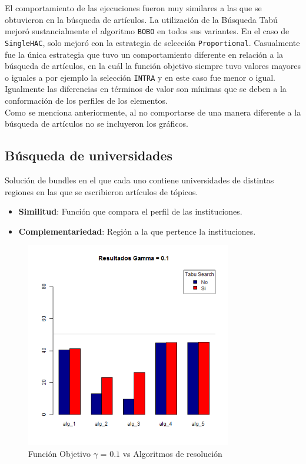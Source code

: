 El comportamiento de las ejecuciones fueron muy similares a las que se obtuvieron en la búsqueda de artículos. La utilización de la Búsqueda Tabú mejoró sustancialmente el algoritmo \texttt{BOBO} en todos sus variantes. En el caso de \texttt{SingleHAC}, solo mejoró con la estrategia de selección \texttt{Proportional}. Casualmente fue la única estrategia que tuvo un comportamiento diferente en relación a la búsqueda de artículos, en la cuál la función objetivo siempre tuvo valores mayores o iguales a por ejemplo la selección \texttt{INTRA} y en este caso fue menor o igual. Igualmente las diferencias en términos de valor son mínimas que se deben a la conformación de los perfiles de los elementos.\\

Como se menciona anteriormente, al no comportarse de una manera diferente a la búsqueda de artículos no se incluyeron los gráficos.
\newpage
\subsection{Búsqueda de universidades}\label{res:busInstituciones}
Solución de bundles en el que cada uno contiene universidades de distintas regiones en las que se escribieron artículos de tópicos.\\
\begin{itemize}
  \item \textbf{Similitud}: Función que compara el perfil de las instituciones.
  \item \textbf{Complementariedad}: Región a la que pertence la instituciones.
\end{itemize}

\begin{figure}[H]
  \centering
    \includegraphics[width=0.8\textwidth]{resultados/affiliations/Graficos_agrupados/gamma01-affiliations.png}
  \caption{Función Objetivo $\gamma$ = $0.1$ vs Algoritmos de resolución}
  \label{res:img-affiliations-agr-gamma01}
\end{figure}

